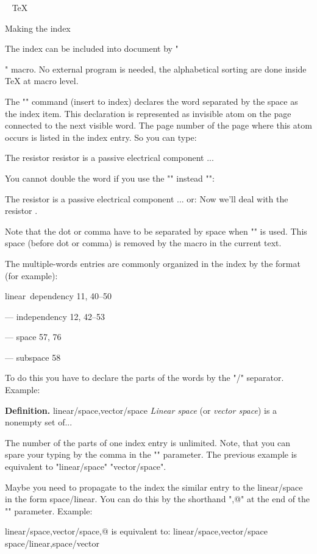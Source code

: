 \begtt
\addprotect~ \addprotect\TeX \addprotect\thefontsize \addprotect\em
\endtt


\sec Making the index 

The index can be included into document by "\makeindex" macro. No external
program is needed, the alphabetical sorting are done inside \TeX{} at macro
level.

The "\ii" command (insert to index) declares the word separated by the space
as the index item. This declaration is represented as invisible atom on the
page connected to the next visible word. The page number of the page where
this atom occurs is listed in the index entry. So you can type:

\begtt
The \ii resistor resistor is a passive electrical component ...
\endtt

You cannot double the word if you use the "\iid" instead "\ii":

\begtt
The \iid resistor is a passive electrical component ...
or:
Now we'll deal with the \iid resistor .
\endtt

Note that the dot or comma have to be separated by space when "\iid" is
used. This space (before dot or comma) is removed by the macro in 
the current text.

The multiple-words entries are commonly organized in the index by the format
(for example): 

\medskip

linear~dependency  11, 40--50

--- independency 12, 42--53

--- space 57, 76

--- subspace 58

\medskip

To do this you have to declare the parts of the words by the "/" separator.
Example:

\begtt
{\bf Definition.}
\ii linear/space,vector/space
{\em Linear space} (or {\em vector space}) is a nonempty set of...
\endtt

The number of the parts of one index entry is unlimited. Note, that you can
spare your typing by the comma in the "\ii" parameter. The previous example
is equivalent to "\ii linear/space" "\ii vector/space".

Maybe you need to propagate to the index the similar entry to the
linear/space in the form space/linear. You can do this by the shorthand ",@"
at the end of the "\ii" parameter. Example:

\begtt
\ii linear/space,vector/space,@
is equivalent to:
\ii linear/space,vector/space \ii space/linear,space/vector
\endtt

